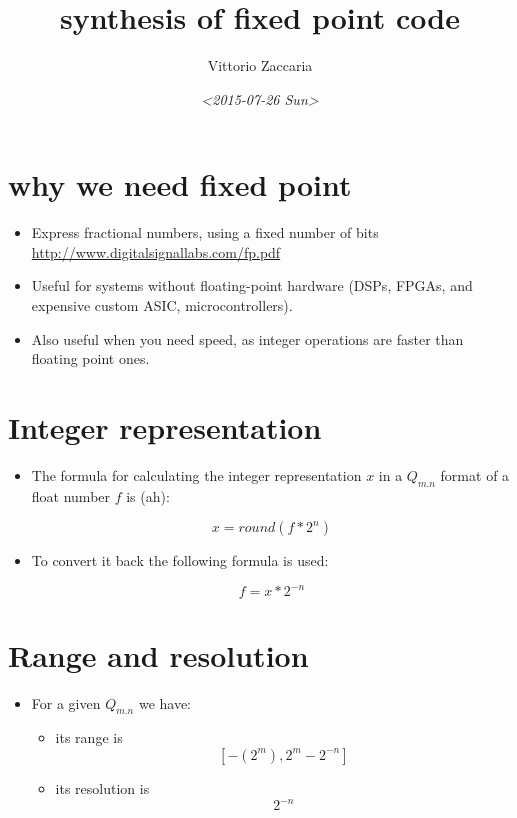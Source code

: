 \documentclass[bigger]{beamer}
\author{Vittorio Zaccaria}
\date{\textit{<2015-07-26 Sun>}}
\title{synthesis of fixed point code}
\begin{document}
\maketitle
\tableofcontents


\section{why we need fixed point}
\label{sec-1}

\begin{itemize}
\item Express fractional numbers, using a fixed number of bits \url{http://www.digitalsignallabs.com/fp.pdf}

\item Useful for systems without floating-point hardware (DSPs, FPGAs, and expensive custom ASIC, microcontrollers).

\item Also useful when you need speed, as integer operations are faster than floating point ones.
\end{itemize}

\section{Integer representation}
\label{sec-2}

\begin{itemize}
\item The formula for calculating the integer representation $x$ in a $Q_{m.n}$ format of a float number $f$ is (ah):

$$x = round(f * 2^n)$$

\item To convert it back the following formula is used:

$$f = x * 2^{-n}$$
\end{itemize}

\section{Range and resolution}
\label{sec-3}

\begin{itemize}
\item For a given $Q_{m.n}$ we have:

\begin{itemize}
\item its range is $$[ - (2^m) , 2^m -2^{-n}]$$

\item its resolution is $$2^{-n}$$
\end{itemize}
\end{itemize}
\end{document}

